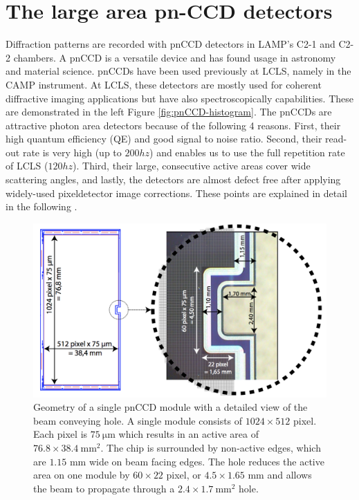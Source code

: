 \section{The large area pn-CCD detectors}\label{sec:pnCCD}
Diffraction patterns are recorded with pnCCD detectors in LAMP's C2-1 and C2-2 chambers. A pnCCD is a versatile device and has found usage in astronomy and material science. pnCCDs have been used previously at LCLS, namely in the CAMP instrument. At LCLS, these detectors are mostly used for coherent diffractive imaging applications but have also spectroscopically capabilities. These are demonstrated in the left Figure \ref{fig:pnCCD-histogram}. The pnCCDs are attractive photon area detectors because of the following 4 reasons. First, their high quantum efficiency (QE) and good signal to noise ratio. Second, their read-out rate is very high (up to $200hz$) and enables us to use the full repetition rate of LCLS ($120hz$). Third, their large, consecutive active areas cover wide scattering angles, and lastly, the detectors are almost defect free after applying widely-used pixeldetector image corrections. These points are explained in detail in the following \citep{Bucher-2016-Unpublished}.\\
%
\begin{figure}
   \includegraphics[width=0.8\linewidth]{images/pnCCD-detail.png}
    \caption[Geometry of a single pnCCD module.]{Geometry of a single pnCCD module with a detailed view of the beam conveying hole. A single module consists of $1024 \times 512$ pixel. Each pixel is $75\ \mathrm{\mu m}$ which results in an active area of $76.8 \times 38.4\ \mathrm{mm}^{2}$. The chip is surrounded by non-active edges, which are $1.15$ mm wide on beam facing edges. The hole reduces the active area on one module by $60\times 22$ pixel, or $4.5 \times 1.65$ mm and allows the beam to propagate through a $2.4 \times 1.7 \ \mathrm{mm}^{2}$ hole.}
\label{fig:ccd-detail}
\end{figure}
